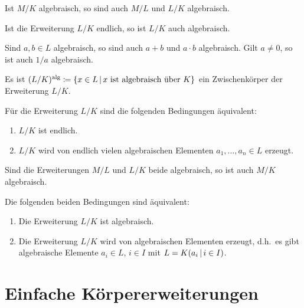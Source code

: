 \begin{lemma}
  Ist $M/K$ algebraisch, so sind auch $M/L$ und $L/K$ algebraisch.
\end{lemma}

\begin{lemma}
  Ist die Erweiterung $L/K$ endlich, so ist $L/K$ auch algebraisch.
\end{lemma}

\begin{corollary}
  Sind $a, b \in L$ algebraisch, so sind auch $a + b$ und $a \cdot b$ algebraisch.
  Gilt $a \neq 0$, so ist auch $1/a$ algebraisch.
\end{corollary}

\begin{corollary}
  Es ist $(L/K)^\alg \defined \{ x \in L \suchthat \text{$x$ ist algebraisch über $K$} \}$ ein Zwischenkörper der Erweiterung $L/K$.
\end{corollary}

\begin{corollary}
  Für die Erweiterung $L/K$ sind die folgenden Bedingungen äquivalent:
  \begin{enumerate}
    \item
      $L/K$ ist endlich.
    \item
      $L/K$ wird von endlich vielen algebraischen Elementen $a_1, \dotsc, a_n \in L$ erzeugt.
  \end{enumerate}
\end{corollary}

\begin{corollary}
  Sind die Erweiterungen $M/L$ und $L/K$ beide algebraisch, so ist auch $M/K$ algebraisch.
\end{corollary}

\begin{corollary}
  Die folgenden beiden Bedingungen sind äquivalent:
  \begin{enumerate}
    \item
      Die Erweiterung $L/K$ ist algebraisch.
    \item
      Die Erweiterung $L/K$ wird von algebraischen Elementen erzeugt, d.h.\ es gibt algebraische Elemente $a_i \in L$, $i \in I$ mit $L = K(a_i \suchthat i \in I)$.
  \end{enumerate}
\end{corollary}






\section{Einfache Körpererweiterungen}

